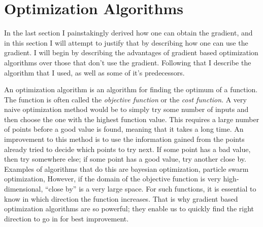 
\section{Optimization Algorithms}

In the last section I painstakingly derived how one can obtain the gradient,
and in this section I will attempt to justify that by describing how one can use
the gradient.
I will begin by describing the advantages of gradient based optimization
algorithms over those that don't use the gradient.
Following that I describe the algorithm that I used, as well as some of it's
predecessors.

An optimization algorithm is an algorithm for finding the optimum of a function.
The function is often called the \emph{objective function} or the \emph{cost
function}.
A very naive optimization method would be to simply try some number of inputs
and then choose the one with the highest function value.
This requires a large number of points before a good value is found,
meaning that it takes a long time.
An improvement to this method is to use the information gained from the points
already tried to decide which points to try next.
If some point has a bad value, then try somewhere else; if some point has a good
value, try another close by.
Examples of algorithms that do this are bayesian optimization, particle swarm
optimization, 
However, if the domain of the objective function is very high-dimensional,
``close by'' is a very large space.
For such functions, it is essential to know in which direction the
function increases.
That is why gradient based optimization algorithms are so powerful;
they enable us to quickly find the right direction to go in for best
improvement.


